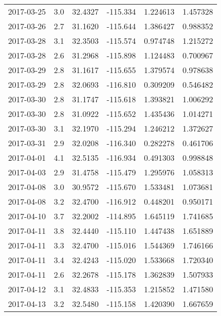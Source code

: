\begin{tabular}{lrrrrr}
2017-03-25 &       3.0 &  32.4327 &  -115.334 &         1.224613 &         1.457328 \\
2017-03-26 &       2.7 &  31.1620 &  -115.644 &         1.386427 &         0.988352 \\
2017-03-28 &       3.1 &  32.3503 &  -115.574 &         0.974748 &         1.215272 \\
2017-03-28 &       2.6 &  31.2968 &  -115.898 &         1.124483 &         0.700967 \\
2017-03-29 &       2.8 &  31.1617 &  -115.655 &         1.379574 &         0.978638 \\
2017-03-29 &       2.8 &  32.0693 &  -116.810 &         0.309209 &         0.546482 \\
2017-03-30 &       2.8 &  31.1747 &  -115.618 &         1.393821 &         1.006292 \\
2017-03-30 &       2.8 &  31.0922 &  -115.652 &         1.435436 &         1.014271 \\
2017-03-30 &       3.1 &  32.1970 &  -115.294 &         1.246212 &         1.372627 \\
2017-03-31 &       2.9 &  32.0208 &  -116.340 &         0.282278 &         0.461706 \\
2017-04-01 &       4.1 &  32.5135 &  -116.934 &         0.491303 &         0.998848 \\
2017-04-03 &       2.9 &  31.4758 &  -115.479 &         1.295976 &         1.058313 \\
2017-04-08 &       3.0 &  30.9572 &  -115.670 &         1.533481 &         1.073681 \\
2017-04-08 &       3.2 &  32.4700 &  -116.912 &         0.448201 &         0.950171 \\
2017-04-10 &       3.7 &  32.2002 &  -114.895 &         1.645119 &         1.741685 \\
2017-04-11 &       3.8 &  32.4440 &  -115.110 &         1.447438 &         1.651889 \\
2017-04-11 &       3.3 &  32.4700 &  -115.016 &         1.544369 &         1.746166 \\
2017-04-11 &       3.4 &  32.4243 &  -115.020 &         1.533668 &         1.720340 \\
2017-04-11 &       2.6 &  32.2678 &  -115.178 &         1.362839 &         1.507933 \\
2017-04-12 &       3.1 &  32.4833 &  -115.353 &         1.215852 &         1.471580 \\
2017-04-13 &       3.2 &  32.5480 &  -115.158 &         1.420390 &         1.667659 \\

\end{tabular}
